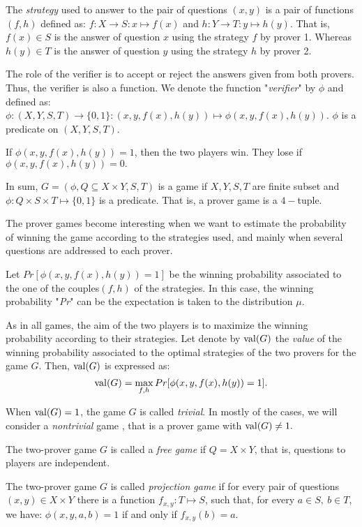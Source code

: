 The \textit{strategy} used to answer to the pair of questions $(x,y)$ is a pair of functions $(f,h)$ defined as: $f: X \longrightarrow S: x \longmapsto f(x)$ and $h: Y \longrightarrow T: y \longmapsto h(y).$ That is, $f(x) \in S$ is the answer of question $x$ using the strategy $f$ by prover 1. Whereas $h(y) \in T$ is the answer of question $y$ using the strategy $h$ by prover 2.

The role of the verifier is to accept or reject the answers given from both provers. Thus, the verifier is also a function. We denote the function "\textit{verifier}" by $\phi$ and defined as: $\phi: (X,Y,S,T) \longrightarrow \{0,1\}: (x,y,f(x),h(y)) \longmapsto  \phi(x,y,f(x),h(y)).$ $\phi$ is a predicate on  $(X,Y,S,T).$

If $\phi(x,y,f(x),h(y))=1$, then the two players win. They lose if $\phi(x,y,f(x),h(y))=0.$ 

In sum, $G=(\phi, Q\subseteq X \times Y, S,T)$ is a game if $X,Y,S,T$ are finite subset and $\phi: Q\times S \times T  \longmapsto \{0,1\}$ is a predicate. That is, a prover game is a $4-$tuple.

The prover games become interesting when we want to estimate the probability of winning the game according to the strategies used, and mainly when several questions are addressed to each prover.

Let $Pr[\phi(x,y,f(x),h(y))=1]$ be the winning probability associated to the one of the couples$(f,h)$ of the strategies. In this case, the winning probability "\textit{Pr}" can be the expectation is taken to the distribution $\mu.$

As in all games, the aim of the two players is to maximize the winning probability according to their strategies. Let denote by $\mathrm{val} (G)$ the \textit{value} of the winning probability associated to the optimal strategies of the two provers for the game $G$. Then, $\mathrm{val} (G)$ is expressed as: $$\mathrm{val} (G)=\max_{f,h} Pr[\phi(x,y,f(x),h(y))=1].$$ 

When $\mathrm{val} (G)=1$, the game $G$ is called \textit{trivial}. In mostly of the cases, we will consider a \textit{nontrivial} game , that is a prover game with $\mathrm{val} (G) \neq 1.$

The two-prover game $G$ is called a \textit{free game} if $Q=X \times Y$, that is, questions to players are  independent. 

The two-prover game $G$ is called \textit{projection game} if for every pair of questions $(x,y) \in X \times Y$ there is a function $f_{x,y}: T \longmapsto S$, such that, for every $a\in S, \ b\in T$, we have: $\phi(x,y,a,b)=1$ if and only if $f_{x,y}(b)=a.$ 

